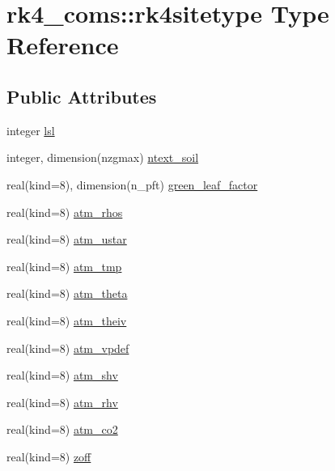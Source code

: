 \hypertarget{structrk4__coms_1_1rk4sitetype}{}\section{rk4\+\_\+coms\+:\+:rk4sitetype Type Reference}
\label{structrk4__coms_1_1rk4sitetype}
\subsection*{Public Attributes}
\begin{DoxyCompactItemize}
\item 
integer \hyperlink{structrk4__coms_1_1rk4sitetype_ac4eedc16dd114a614202278468361154}{lsl}
\item 
integer, dimension(nzgmax) \hyperlink{structrk4__coms_1_1rk4sitetype_a06699fc4f734df67e459db73b40c4c15}{ntext\+\_\+soil}
\item 
real(kind=8), dimension(n\+\_\+pft) \hyperlink{structrk4__coms_1_1rk4sitetype_af3b40b167be82116033e3a4f4822294a}{green\+\_\+leaf\+\_\+factor}
\item 
real(kind=8) \hyperlink{structrk4__coms_1_1rk4sitetype_a5ee30feb961affb97521718f4b02b6cc}{atm\+\_\+rhos}
\item 
real(kind=8) \hyperlink{structrk4__coms_1_1rk4sitetype_a2e45ed4abff0bddac0e01799f5383201}{atm\+\_\+ustar}
\item 
real(kind=8) \hyperlink{structrk4__coms_1_1rk4sitetype_a1fd547fce62b744e2b9be149aa91f7fd}{atm\+\_\+tmp}
\item 
real(kind=8) \hyperlink{structrk4__coms_1_1rk4sitetype_a3bb57b681c3a3fd9c968943550cfc726}{atm\+\_\+theta}
\item 
real(kind=8) \hyperlink{structrk4__coms_1_1rk4sitetype_aeb8be930c7e6036105ead2a1964ba411}{atm\+\_\+theiv}
\item 
real(kind=8) \hyperlink{structrk4__coms_1_1rk4sitetype_a74c103525473fa71eb8e33bc33c065e3}{atm\+\_\+vpdef}
\item 
real(kind=8) \hyperlink{structrk4__coms_1_1rk4sitetype_aa86c1063a0c8ca0621cd6c38a446519f}{atm\+\_\+shv}
\item 
real(kind=8) \hyperlink{structrk4__coms_1_1rk4sitetype_a04dd6f5eb1f9b16978271042e72a0873}{atm\+\_\+rhv}
\item 
real(kind=8) \hyperlink{structrk4__coms_1_1rk4sitetype_a998abde545815c85736e2ae05e2006fb}{atm\+\_\+co2}
\item 
real(kind=8) \hyperlink{structrk4__coms_1_1rk4sitetype_ae287d5e2de06575d3a27e51b5fce0acd}{zoff}

\end{DoxyCompactItemize}
